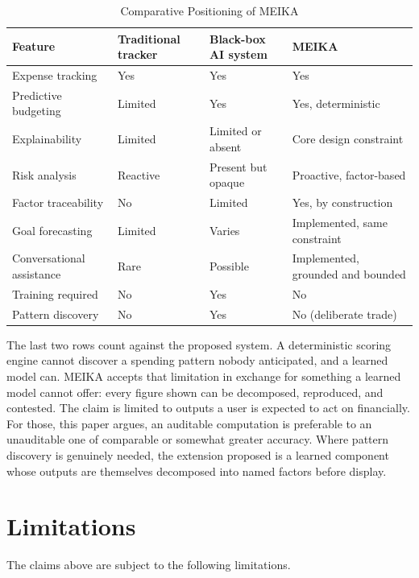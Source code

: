 \documentclass[conference]{IEEEtran}
\begin{document}
\begin{table}[!t]
\centering
\caption{Comparative Positioning of MEIKA}
\label{tab:comparison}
\footnotesize
\renewcommand{\arraystretch}{1.3}
\begin{tabular}{|p{1.8cm}|p{1.5cm}|p{1.7cm}|p{2.0cm}|}
\hline
\textbf{Feature} & \textbf{Traditional tracker} & \textbf{Black-box AI system} & \textbf{MEIKA} \\
\hline
Expense tracking & Yes & Yes & Yes \\
\hline
Predictive budgeting & Limited & Yes & Yes, deterministic \\
\hline
Explainability & Limited & Limited or absent & Core design constraint \\
\hline
Risk analysis & Reactive & Present but opaque & Proactive, factor-based \\
\hline
Factor traceability & No & Limited & Yes, by construction \\
\hline
Goal forecasting & Limited & Varies & Implemented, same constraint \\
\hline
Conversational assistance & Rare & Possible & Implemented, grounded and bounded \\
\hline
Training required & No & Yes & No \\
\hline
Pattern discovery & No & Yes & No (deliberate trade) \\
\hline
\end{tabular}
\end{table}

The last two rows count against the proposed system. A deterministic scoring engine cannot discover a spending pattern nobody anticipated, and a learned model can. MEIKA accepts that limitation in exchange for something a learned model cannot offer: every figure shown can be decomposed, reproduced, and contested. The claim is limited to outputs a user is expected to act on financially. For those, this paper argues, an auditable computation is preferable to an unauditable one of comparable or somewhat greater accuracy. Where pattern discovery is genuinely needed, the extension proposed is a learned component whose outputs are themselves decomposed into named factors before display.

\section{Limitations}

The claims above are subject to the following limitations.
\end{document}
